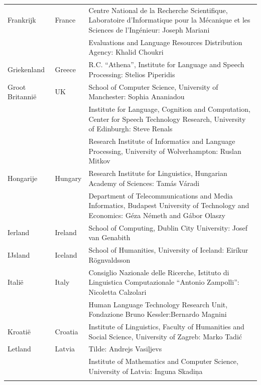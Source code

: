 \documentclass[]{../../metanetpaper}
\begin{document}
\begin{longtable}{@{}llp{113mm}@{}}
  Frankrijk & \textcolor{grey1}{France} & Centre National de la Recherche Scientifique, Laboratoire d'Informatique pour la Mécanique et les Sciences de l'Ingénieur: Joseph Mariani \\ \addlinespace
  & & Evaluations and Language Resources Distribution Agency: Khalid Choukri\\ \addlinespace
  Griekenland & \textcolor{grey1}{Greece} & R.C. “Athena”, Institute for Language and Speech Processing: Stelios Piperidis\\ \addlinespace
  Groot Britanni{\"e} & \textcolor{grey1}{UK} &
  School of Computer Science, University of Manchester: Sophia Ananiadou \\ \addlinespace
  & & Institute for Language, Cognition and Computation, Center for Speech Technology Research, University of Edinburgh: Steve Renals \\ \addlinespace
  & & Research Institute of Informatics and Language Processing, University of Wolverhampton: Ruslan Mitkov \\ \addlinespace
   Hongarije & \textcolor{grey1}{Hungary} & Research Institute for Linguistics, Hungarian Academy of Sciences: Tamás Váradi\\  \addlinespace
  & & Department of Telecommunications and Media Informatics, Budapest University of Technology and Economics: Géza Németh and Gábor Olaszy\\ \addlinespace
  Ierland & \textcolor{grey1}{Ireland} & School of Computing, Dublin City University: Josef van Genabith\\ \addlinespace
  IJsland & \textcolor{grey1}{Iceland} & School of Humanities, University of Iceland: Eiríkur Rögnvaldsson\\ \addlinespace
  Itali{\"e} & \textcolor{grey1}{Italy} & Consiglio Nazionale delle Ricerche, Istituto di Linguistica Computazionale “Antonio Zampolli”: Nicoletta Calzolari\\ \addlinespace
  & & Human Language Technology Research Unit, Fondazione Bruno Kessler:\newline Bernardo Magnini\\ \addlinespace
  Kroati{\"e} & \textcolor{grey1}{Croatia} & Institute of Linguistics, Faculty of Humanities and Social Science, University of Zagreb: Marko Tadić \\ \addlinespace
  Letland & \textcolor{grey1}{Latvia} & Tilde: Andrejs Vasiļjevs\\ \addlinespace
  & & Institute of Mathematics and Computer Science, University of Latvia: Inguna Skadiņa\\ \addlinespace

\end{longtable}
\end{document}
